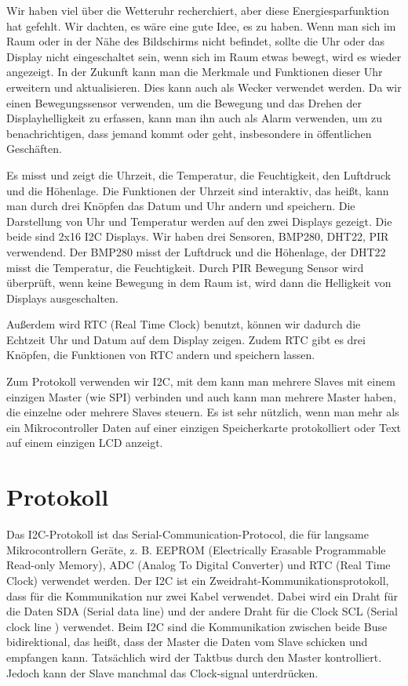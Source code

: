 \documentclass[conference]{IEEEtran}
\begin{document}
Wir haben viel über die Wetteruhr recherchiert, aber diese Energiesparfunktion hat gefehlt. Wir dachten, es wäre eine gute Idee, es zu haben. Wenn man sich im Raum oder in der Nähe des Bildschirms nicht befindet, sollte die Uhr oder das Display nicht eingeschaltet sein, wenn sich im Raum etwas bewegt, wird es wieder angezeigt. In der Zukunft kann man die Merkmale und Funktionen dieser Uhr erweitern und aktualisieren. Dies kann auch als Wecker verwendet werden. Da wir einen Bewegungssensor verwenden, um die Bewegung 
und das Drehen der Displayhelligkeit zu erfassen, kann man ihn auch als Alarm verwenden, um zu benachrichtigen, dass jemand kommt oder geht, insbesondere in öffentlichen Geschäften.

Es misst und zeigt die Uhrzeit, die Temperatur, die Feuchtigkeit, den Luftdruck und die Höhenlage. Die Funktionen der Uhrzeit sind interaktiv, das heißt, kann man durch drei Knöpfen das Datum und Uhr andern und speichern. Die Darstellung von Uhr und Temperatur werden auf den zwei Displays gezeigt. Die beide sind 2x16 I2C Displays. 
Wir haben drei Sensoren, BMP280, DHT22, PIR verwendend. Der BMP280 misst der Luftdruck und die Höhenlage, der DHT22 misst die Temperatur, die Feuchtigkeit. Durch PIR Bewegung Sensor wird überprüft, wenn keine Bewegung in dem Raum ist, wird dann die Helligkeit von Displays ausgeschalten.

Außerdem wird RTC (Real Time Clock) benutzt, können wir dadurch die Echtzeit Uhr und Datum auf dem Display zeigen. Zudem RTC gibt es drei Knöpfen, die Funktionen von RTC andern und speichern lassen.  

Zum Protokoll verwenden wir I2C, mit dem kann man mehrere Slaves mit einem einzigen Master (wie SPI) verbinden und auch kann man mehrere Master haben, die einzelne oder mehrere Slaves steuern. Es ist sehr nützlich, wenn man mehr als ein Mikrocontroller Daten auf einer einzigen Speicherkarte protokolliert oder Text auf einem einzigen LCD anzeigt.

\section{Protokoll}
Das I2C-Protokoll ist das Serial-Communication-Protocol, die für langsame Mikrocontrollern Geräte, z. B. EEPROM (Electrically Erasable Programmable Read-only Memory), ADC (Analog To Digital Converter) und RTC (Real Time Clock) verwendet werden. Der I2C ist ein Zweidraht-Kommunikationsprotokoll, dass für die Kommunikation nur zwei Kabel verwendet. Dabei wird ein Draht für die Daten SDA (Serial data line) und der andere Draht für die Clock SCL (Serial clock line ) verwendet. Beim I2C sind die Kommunikation zwischen beide Buse bidirektional, das heißt, dass der Master die Daten vom Slave schicken und empfangen kann. Tatsächlich wird der Taktbus durch den Master kontrolliert. Jedoch kann der Slave manchmal das Clock-signal unterdrücken. 
\end{document}
